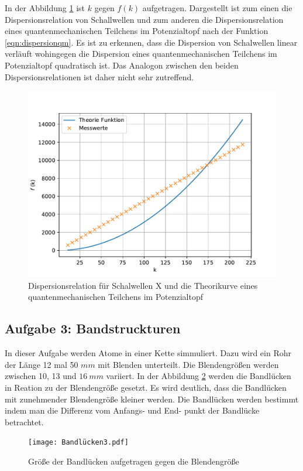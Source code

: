 In der Abbildung \ref{fig.Aufgabe2} ist $k$ gegen $f(k)$ aufgetragen. Dargestellt ist zum einen die Dispersionsrelation von Schallwellen und zum anderen die Dispersionsrelation eines quantenmechanischen Teilchens im Potenzialtopf nach der Funktion \ref{eqn:dispersionqm}.
Es ist zu erkennen, dass die Dispersion von Schalwellen linear verläuft wohingegen die Dispersion eines quantenmechanischen Teilchens im Potenzialtopf quadratisch ist.
Das Analogon zwischen den beiden Dispersionsrelationen ist daher nicht sehr zutreffend.
\begin{figure}[h!]
  \centering
  \includegraphics[width=\textwidth]{f(k).pdf}
  \caption{Dispersionsrelation für Schalwellen X und die Theorikurve eines quantenmechanischen Teilchens im Potenzialtopf}
  \label{fig.Aufgabe2}
\end{figure}
\FloatBarrier

\subsection{Aufgabe 3: Bandstruckturen}
In dieser Aufgabe werden Atome in einer Kette simmuliert.
Dazu wird ein Rohr der Länge 12 mal 50 $\si{mm}$ mit Blenden unterteilt.
Die Blendengrößen werden zwischen 10, 13 und $\SI{16}{mm}$ variiert.
In der Abbildung \ref{fig.Aufgabe3} werden die Bandlücken in Reation zu der Blendengröße gesetzt.
Es wird deutlich, dass die Bandlücken mit zunehmender Blendengröße kleiner werden.
Die Bandlücken werden bestimmt indem man die Differenz vom Anfangs- und End- punkt der Bandlücke betrachtet.
\begin{figure}[h!]
  \centering
  \texttt{[image: Bandlücken3.pdf]}
  \caption{Größe der Bandlücken aufgetragen gegen die Blendengröße}
  \label{fig.Aufgabe3}
\end{figure}
\FloatBarrier

